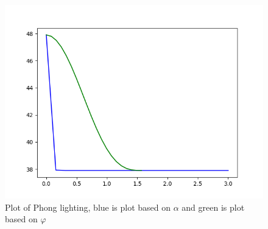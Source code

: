 \documentclass{article}
\begin{document}
\begin{figure}[H]
    \centering
    \includegraphics[width=1\textwidth]{phong.png} 
    \caption{Plot of Phong lighting, blue is plot based on $\alpha$ and green is plot based on $\varphi$}
    \label{fig:pho}
\end{figure}




    \newpage
    \printbibliography
\end{document}
